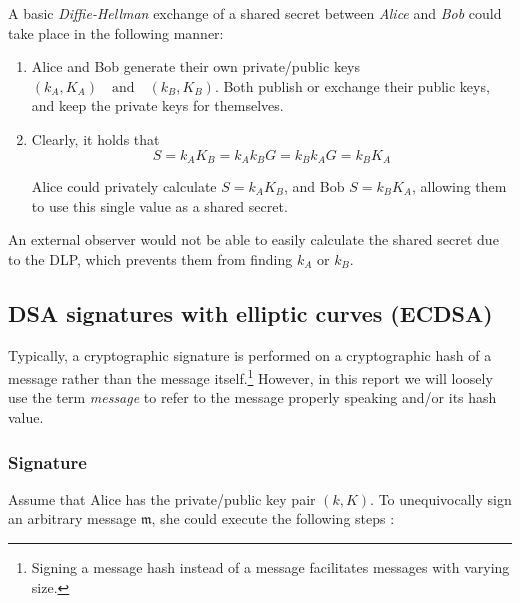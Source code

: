 A basic {\em Diffie-Hellman} exchange of a shared secret between {\em Alice} and {\em Bob} could take place in the following manner:

\begin{enumerate}
	
	\item Alice and Bob generate their own private/public keys \((k_A, K_A) \quad \textrm{and} \quad (k_B, K_B)\). Both publish or exchange their public keys, and keep the private keys for themselves.
	
	\item Clearly, it holds that \[S = k_A K_B = k_A k_B G = k_B k_A G = k_B K_A\]
	
	 Alice could privately calculate \(S = k_A K_B\), and Bob \(S = k_B K_A\), allowing them to use this single value as a shared secret.
	
\end{enumerate}   

An external observer would not be able to easily calculate the shared secret due to the DLP, which prevents them from finding $k_A$ or $k_B$.


\subsection{DSA signatures with elliptic curves (ECDSA)\footnotemark}
\label{ECDSA_section}


Typically, a cryptographic signature is performed on a cryptographic hash of a message rather than the message itself.\footnote{\label{message_hash_note}Signing a message hash instead of a message facilitates messages with varying size.} However, in this report we will loosely use the term {\em message} to refer to the message properly speaking and/or its hash value.

\subsubsection*{Signature}

Assume that Alice has the private/public key pair \((k, K)\). To unequivocally sign an arbitrary message  \(\mathfrak{m}\), she could execute the following steps \cite{Hankerson:2003:GEC:940321}:

